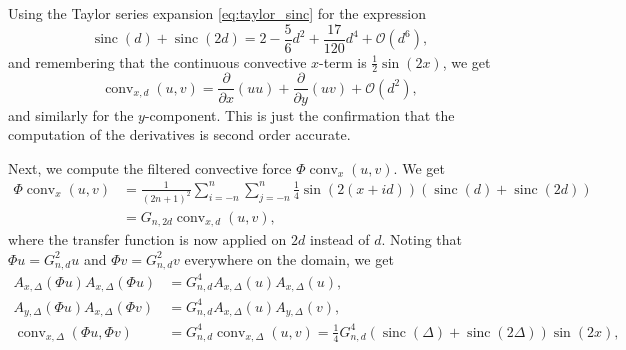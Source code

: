 \documentclass[preprint]{elsarticle}
\newcommand{\sinc}{\operatorname{sinc}}
\begin{document}
Using the Taylor series expansion \eqref{eq:taylor_sinc} for the expression
\begin{equation}
    \sinc(d) + \sinc(2 d) =
    2 - \frac{5}{6} d^2 + \frac{17}{120} d^4 + \mathcal{O}(d^6),
\end{equation}
and remembering that the continuous convective $x$-term is
$\frac{1}{2} \sin(2 x) $, we get
\begin{equation}
    \operatorname{conv}_{x, d}(u, v) =
    \frac{\partial }{\partial x} (u u) +
    \frac{\partial }{\partial y} (u v) +
    \mathcal{O}(d^2),
\end{equation}
and similarly for the $y$-component. This is just the confirmation that the computation of the derivatives is second order accurate.

Next, we compute the filtered convective force
$\Phi \operatorname{conv}_x(u, v)$. We get 
\begin{equation}
    \begin{split}
        \Phi \operatorname{conv}_x(u, v)
        & =
        \frac{1}{(2 n + 1)^2}
        \sum_{i = -n}^{n}
        \sum_{j = -n}^{n}
        \frac{1}{4} \sin(2 (x + i d)) (\sinc(d) + \sinc(2 d))
         \\
        & =
        G_{n, 2 d} \operatorname{conv}_{x, d}(u, v),
    \end{split}
\end{equation}
where the transfer function is now applied on $2 d$ instead of $d$.
Noting that $\Phi u = G_{n, d}^2 u$ and $\Phi v = G_{n, d}^2 v$ everywhere on
the domain, we get
\begin{equation}
    \begin{split}
        A_{x, \Delta}(\Phi u) A_{x, \Delta}(\Phi u) & = G_{n, d}^4 A_{x, \Delta}(u) A_{x, \Delta}(u), \\
        A_{y, \Delta}(\Phi u) A_{x, \Delta}(\Phi v) & = G_{n, d}^4 A_{x, \Delta}(u) A_{y, \Delta}(v), \\
        \operatorname{conv}_{x, \Delta}(\Phi u, \Phi v) & = G_{n, d}^4 \operatorname{conv}_{x, \Delta}(u, v)
        = \frac{1}{4} G_{n, d}^4 (\sinc(\Delta) + \sinc(2 \Delta)) \sin(2 x) ,
    \end{split}
\end{equation}
\end{document}

